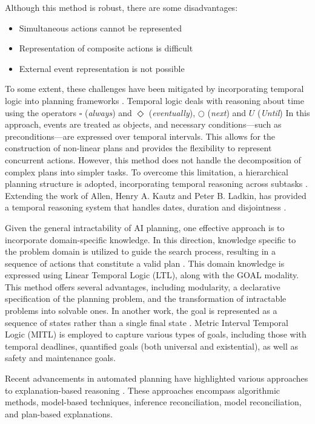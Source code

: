 \documentclass[a4paper,11pt]{lmcs}
\begin{document}
Although this method is robust, there are some disadvantages:
\begin{itemize}
 \item Simultaneous actions cannot be represented
 \item Representation of composite actions is difficult
 \item External event representation is not possible
\end{itemize}
To some extent, these challenges have been mitigated by incorporating temporal logic into planning frameworks \citep{allen}. Temporal logic deals with reasoning about time using the operators $\square$ (\textit{always}) and $\Diamond$ (\textit{eventually}), $\bigcirc$ (\textit{next}) and $U$ (\textit{Until}) \citep{huth} In this approach, events are treated as objects, and necessary conditions—such as preconditions—are expressed over temporal intervals. This allows for the construction of non-linear plans and provides the flexibility to represent concurrent actions. However, this method does not handle the decomposition of complex plans into simpler tasks. To overcome this limitation, a hierarchical planning structure is adopted, incorporating temporal reasoning across subtasks \citep{fei}.
Extending the work of Allen, Henry A. Kautz and Peter B. Ladkin, has provided a temporal reasoning system that handles dates, duration and disjointness \citep{kautz}.

Given the general intractability of AI planning, one effective approach is to incorporate domain-specific knowledge. In this direction, knowledge specific to the problem domain is utilized to guide the search process, resulting in a sequence of actions that constitute a valid plan \citep{Bacchus2000}. This domain knowledge is expressed using Linear Temporal Logic (LTL), along with the GOAL modality. This method offers several advantages, including modularity, a declarative specification of the planning problem, and the transformation of intractable problems into solvable ones. In another work, the goal is represented as a sequence of states rather than a single final state \citep{Bacchus1996}. Metric Interval Temporal Logic (MITL) is employed to capture various types of goals, including those with temporal deadlines, quantified goals (both universal and existential), as well as safety and maintenance goals.

Recent advancements in automated planning have highlighted various approaches to explanation-based reasoning \citep{expai}. These approaches encompass algorithmic methods, model-based techniques, inference reconciliation, model reconciliation, and plan-based explanations.
\end{document}
